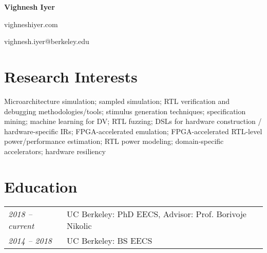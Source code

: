 \documentclass[10pt]{article}
\begin{document}
\begin{center}
    {\LARGE \textbf{Vighnesh Iyer}}

    {\small vighneshiyer.com}

    {\small vighnesh.iyer@berkeley.edu}
\end{center}

\section{Research Interests}
\vspace{-0.1cm}
{Microarchitecture simulation; sampled simulation; RTL verification and debugging methodologies/tools; stimulus generation techniques; specification mining; machine learning for DV; RTL fuzzing; DSLs for hardware construction / hardware-specific IRs; FPGA-accelerated emulation; FPGA-accelerated RTL-level power/performance estimation; RTL power modeling; domain-specific accelerators; hardware resiliency}
\vspace{-0.2cm}

\section{Education}
\vspace{-0.1cm}
\begin{tabular}{@{}ll}
    \textit{2018 -- current} & UC Berkeley: PhD EECS, Advisor: Prof. Borivoje Nikolic\\
    \textit{2014 -- 2018} & UC Berkeley: BS EECS
\end{tabular}
\vspace{-0.2cm}
\end{document}
